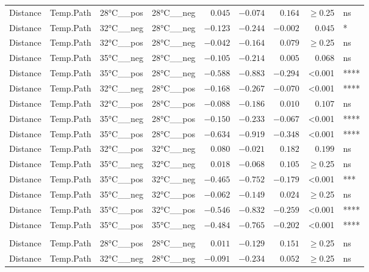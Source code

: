 \documentclass[
]{article}
\begin{document}
\begin{longtable}{llllrrrrl}
\midrule\addlinespace[2.5pt]
\multicolumn{9}{l}{canberra} \\ 
\midrule\addlinespace[2.5pt]
Distance & Temp.Path & 28°C\_\_pos & 28°C\_\_neg & $0.045$ & $-0.074$ & $0.164$ & $\geq$0.25 & ns \\ 
Distance & Temp.Path & 32°C\_\_neg & 28°C\_\_neg & $-0.123$ & $-0.244$ & $-0.002$ & $0.045$ & * \\ 
Distance & Temp.Path & 32°C\_\_pos & 28°C\_\_neg & $-0.042$ & $-0.164$ & $0.079$ & $\geq$0.25 & ns \\ 
Distance & Temp.Path & 35°C\_\_neg & 28°C\_\_neg & $-0.105$ & $-0.214$ & $0.005$ & $0.068$ & ns \\ 
Distance & Temp.Path & 35°C\_\_pos & 28°C\_\_neg & $-0.588$ & $-0.883$ & $-0.294$ & <0.001 & **** \\ 
Distance & Temp.Path & 32°C\_\_neg & 28°C\_\_pos & $-0.168$ & $-0.267$ & $-0.070$ & <0.001 & **** \\ 
Distance & Temp.Path & 32°C\_\_pos & 28°C\_\_pos & $-0.088$ & $-0.186$ & $0.010$ & $0.107$ & ns \\ 
Distance & Temp.Path & 35°C\_\_neg & 28°C\_\_pos & $-0.150$ & $-0.233$ & $-0.067$ & <0.001 & **** \\ 
Distance & Temp.Path & 35°C\_\_pos & 28°C\_\_pos & $-0.634$ & $-0.919$ & $-0.348$ & <0.001 & **** \\ 
Distance & Temp.Path & 32°C\_\_pos & 32°C\_\_neg & $0.080$ & $-0.021$ & $0.182$ & $0.199$ & ns \\ 
Distance & Temp.Path & 35°C\_\_neg & 32°C\_\_neg & $0.018$ & $-0.068$ & $0.105$ & $\geq$0.25 & ns \\ 
Distance & Temp.Path & 35°C\_\_pos & 32°C\_\_neg & $-0.465$ & $-0.752$ & $-0.179$ & <0.001 & *** \\ 
Distance & Temp.Path & 35°C\_\_neg & 32°C\_\_pos & $-0.062$ & $-0.149$ & $0.024$ & $\geq$0.25 & ns \\ 
Distance & Temp.Path & 35°C\_\_pos & 32°C\_\_pos & $-0.546$ & $-0.832$ & $-0.259$ & <0.001 & **** \\ 
Distance & Temp.Path & 35°C\_\_pos & 35°C\_\_neg & $-0.484$ & $-0.765$ & $-0.202$ & <0.001 & **** \\ 
\midrule\addlinespace[2.5pt]
\multicolumn{9}{l}{gunifrac} \\ 
\midrule\addlinespace[2.5pt]
Distance & Temp.Path & 28°C\_\_pos & 28°C\_\_neg & $0.011$ & $-0.129$ & $0.151$ & $\geq$0.25 & ns \\ 
Distance & Temp.Path & 32°C\_\_neg & 28°C\_\_neg & $-0.091$ & $-0.234$ & $0.052$ & $\geq$0.25 & ns \\ 

\end{longtable}
\end{document}
